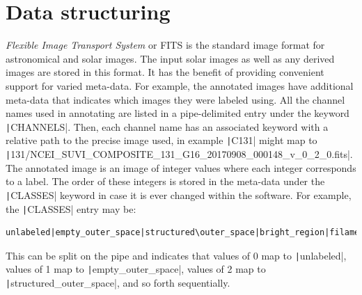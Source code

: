 \documentclass[twoside]{report}
\newcommand{\code}[1]{\texttt|#1|}
\begin{document}
\section{Data structuring}
\textit{Flexible Image Transport System} or FITS is the standard image format for astronomical and solar images. The input solar images as well as any derived images are stored in this format. It has the benefit of providing convenient support for varied meta-data. For example, the annotated images have additional meta-data that indicates which images they were labeled using. All the channel names used in annotating are listed in a pipe-delimited entry under the keyword \code{CHANNELS}. Then, each channel name has an associated keyword with a relative path to the precise image used, in example \code{C131} might map to \code{131/NCEI_SUVI_COMPOSITE_131_G16_20170908_000148_v_0_2_0.fits}. The annotated image is an image of integer values where each integer corresponds to a label. The order of these integers is stored in the meta-data under the \code{CLASSES} keyword in case it is ever changed within the software. For example, the \code{CLASSES} entry may be:
\begin{lstlisting}
unlabeled|empty_outer_space|structured\outer_space|bright_region|filament|prominence|coronal_hole|quiet_sun|limb|flare
\end{lstlisting}
This can be split on the pipe and indicates that values of 0 map to \code{unlabeled}, values of 1 map to \code{empty_outer_space}, values of 2 map to \code{structured_outer_space}, and so forth sequentially. 
\end{document}
